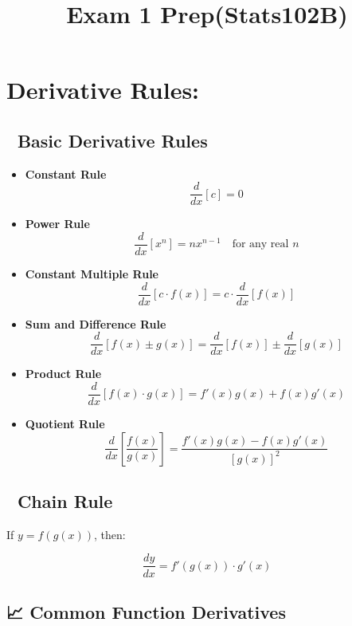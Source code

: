 \documentclass[
  letterpaper,
  DIV=11,
  numbers=noendperiod]{scrartcl}
\title{Exam 1 Prep(Stats102B)}
\author{}
\date{}
\begin{document}
\maketitle


\section{Derivative Rules:}\label{derivative-rules}

\subsection{📘 Basic Derivative Rules}\label{basic-derivative-rules}

\begin{itemize}
\item
  \textbf{Constant Rule}\\
  \[
  \frac{d}{dx}[c] = 0
  \]
\item
  \textbf{Power Rule}\\
  \[
  \frac{d}{dx}[x^n] = nx^{n-1} \quad \text{for any real } n
  \]
\item
  \textbf{Constant Multiple Rule}\\
  \[
  \frac{d}{dx}[c \cdot f(x)] = c \cdot \frac{d}{dx}[f(x)]
  \]
\item
  \textbf{Sum and Difference Rule}\\
  \[
  \frac{d}{dx}[f(x) \pm g(x)] = \frac{d}{dx}[f(x)] \pm \frac{d}{dx}[g(x)]
  \]
\item
  \textbf{Product Rule}\\
  \[
  \frac{d}{dx}[f(x) \cdot g(x)] = f'(x)g(x) + f(x)g'(x)
  \]
\item
  \textbf{Quotient Rule}\\
  \[
  \frac{d}{dx}\left[\frac{f(x)}{g(x)}\right] = \frac{f'(x)g(x) - f(x)g'(x)}{[g(x)]^2}
  \]
\end{itemize}

\subsection{🔁 Chain Rule}\label{chain-rule}

If \(y = f(g(x))\), then:

\[
\frac{dy}{dx} = f'(g(x)) \cdot g'(x)
\]

\subsection{📈 Common Function
Derivatives}\label{common-function-derivatives}
\end{document}
